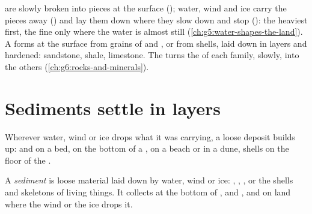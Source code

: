 \begin{recall}
 are slowly broken into pieces at the surface (\emph{});
water, wind and ice carry the pieces away (\emph{}) and lay them
down where they slow down and stop (\emph{}): the heaviest
first, the fine  only where the water is almost still
(\cref{ch:g5:water-shapes-the-land}). A \emph{} forms at
the surface from grains of  and , or from shells, laid down in
layers and hardened: sandstone, shale, limestone. The  turns
the  of each family, slowly, into the others
(\cref{ch:g6:rocks-and-minerals}).
\end{recall}

\section{Sediments settle in layers}

Wherever water, wind or ice drops what it was carrying, a loose deposit
builds up:  and  on a  bed,  on the bottom of a ,
 on a beach or in a dune, shells on the floor of the .

\begin{definition}[Sediment]\label{def:g7:sediments-and-fossils:sediment}
A \emph{sediment} is loose material laid down by water,
wind or ice: , , , or the shells and skeletons of living
things. It collects at the bottom of ,  and , and on land
where the wind or the ice drops it.
\end{definition}

